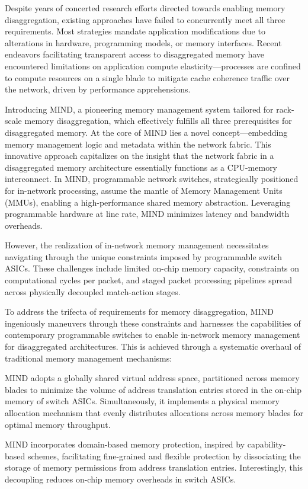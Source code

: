Despite years of concerted research efforts directed towards enabling memory disaggregation, existing approaches have failed to concurrently meet all three requirements. Most strategies mandate application modifications due to alterations in hardware, programming models, or memory interfaces. Recent endeavors facilitating transparent access to disaggregated memory have encountered limitations on application compute elasticity—processes are confined to compute resources on a single blade to mitigate cache coherence traffic over the network, driven by performance apprehensions.

Introducing MIND, a pioneering memory management system tailored for rack-scale memory disaggregation, which effectively fulfills all three prerequisites for disaggregated memory. At the core of MIND lies a novel concept—embedding memory management logic and metadata within the network fabric. This innovative approach capitalizes on the insight that the network fabric in a disaggregated memory architecture essentially functions as a CPU-memory interconnect. In MIND, programmable network switches, strategically positioned for in-network processing, assume the mantle of Memory Management Units (MMUs), enabling a high-performance shared memory abstraction. Leveraging programmable hardware at line rate, MIND minimizes latency and bandwidth overheads.

However, the realization of in-network memory management necessitates navigating through the unique constraints imposed by programmable switch ASICs. These challenges include limited on-chip memory capacity, constraints on computational cycles per packet, and staged packet processing pipelines spread across physically decoupled match-action stages.

To address the trifecta of requirements for memory disaggregation, MIND ingeniously maneuvers through these constraints and harnesses the capabilities of contemporary programmable switches to enable in-network memory management for disaggregated architectures. This is achieved through a systematic overhaul of traditional memory management mechanisms:

MIND adopts a globally shared virtual address space, partitioned across memory blades to minimize the volume of address translation entries stored in the on-chip memory of switch ASICs. Simultaneously, it implements a physical memory allocation mechanism that evenly distributes allocations across memory blades for optimal memory throughput.

MIND incorporates domain-based memory protection, inspired by capability-based schemes, facilitating fine-grained and flexible protection by dissociating the storage of memory permissions from address translation entries. Interestingly, this decoupling reduces on-chip memory overheads in switch ASICs.


